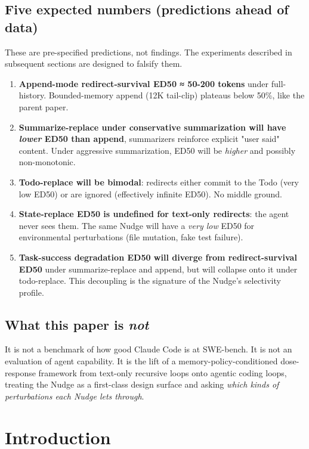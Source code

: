 \documentclass{article}
\theoremstyle{plain}
\theoremstyle{definition}
\begin{document}
\subsection*{Five expected numbers (predictions ahead of data)}

These are pre-specified predictions, not findings. The experiments described in subsequent sections are designed to falsify them.

\begin{enumerate}
  \item \textbf{Append-mode redirect-survival ED50 ≈ 50-200 tokens} under full-history. Bounded-memory append (12K tail-clip) plateaus below 50\%, like the parent paper.
  \item \textbf{Summarize-replace under conservative summarization will have \textit{lower} ED50 than append}, summarizers reinforce explicit "user said" content. Under aggressive summarization, ED50 will be \textit{higher} and possibly non-monotonic.
  \item \textbf{Todo-replace will be bimodal}: redirects either commit to the Todo (very low ED50) or are ignored (effectively infinite ED50). No middle ground.
  \item \textbf{State-replace ED50 is undefined for text-only redirects}: the agent never sees them. The same Nudge will have a \textit{very low} ED50 for environmental perturbations (file mutation, fake test failure).
  \item \textbf{Task-success degradation ED50 will diverge from redirect-survival ED50} under summarize-replace and append, but will collapse onto it under todo-replace. This decoupling is the signature of the Nudge's selectivity profile.
\end{enumerate}

\subsection*{What this paper is \textit{not}}

It is not a benchmark of how good Claude Code is at SWE-bench. It is not an evaluation of agent capability. It is the lift of a memory-policy-conditioned dose-response framework from text-only recursive loops onto agentic coding loops, treating the Nudge as a first-class design surface and asking \textit{which kinds of perturbations each Nudge lets through}.


\section{Introduction}
\end{document}
